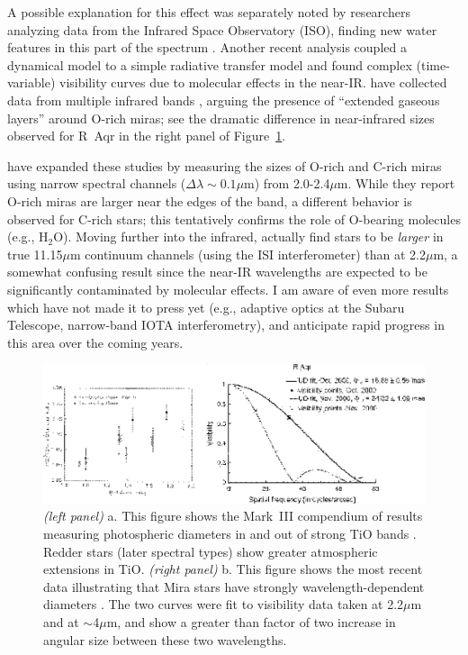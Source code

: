 \documentclass[12pt]{article}
\begin{document}
A possible explanation for this effect was separately noted by
researchers analyzing data from the Infrared Space Observatory (ISO),
finding new water features in this part of the spectrum
\citep[e.g.,][]{tsuji1997,matsuura2002}.  Another recent analysis
\citep{jacob2002} coupled a dynamical model to a simple radiative
transfer model and found complex (time-variable) visibility curves due
to molecular effects in the near-IR.  \citet{mennesson2002} have
collected data from multiple infrared bands
\citep[e.g.,][]{chagnon2002}, arguing the presence of ``extended
gaseous layers'' around O-rich miras; see the dramatic difference in
near-infrared sizes observed for R~Aqr in the right panel of
Figure~\ref{atmospheres}.

\citet{thompson2002a} have expanded these studies by measuring the
sizes of O-rich and C-rich miras using narrow spectral channels
($\Delta\lambda\sim 0.1\mu$m) from 2.0-2.4$\mu$m.  While they report
O-rich miras are larger near the edges of the band, a different
behavior is observed for C-rich stars; this tentatively confirms the
role of O-bearing molecules (e.g., H$_2$O).  Moving further into the
infrared, \citet{weiner2000} \citep[following earlier work
by][]{bester1996} actually find stars to be {\em larger} in true
11.15$\mu$m continuum channels (using the ISI interferometer) than at
2.2$\mu$m, a somewhat confusing result since the near-IR wavelengths
are expected to be significantly contaminated by molecular effects.  I
am aware of even more results which have not made it to press yet
(e.g., adaptive optics at the Subaru Telescope, narrow-band IOTA
interferometry), and anticipate rapid progress in this area over the
coming years.

\begin{figure}[tbhp]
\begin{center}
\includegraphics[clip,angle=0,width=5.0in]{Figures/JDM_molecdiameters.eps}
\caption{\footnotesize {\em (left panel)} a. 
  This figure shows the Mark~III compendium of results measuring
  photospheric diameters in and out of strong TiO bands
  \citep[reproduced from Figure~2 of][with permission of the
  AAS]{quirrenbach1993a}. Redder stars (later spectral types) show
  greater atmospheric extensions in TiO.
{\em (right panel)} b. This figure shows the most recent
data illustrating that Mira stars have strongly wavelength-dependent
diameters
\citep[reproduced from Figure~2 of][with permission of the AAS]{mennesson2002}.
The two curves were fit to visibility data taken at 2.2$\mu$m and at
$\sim$4$\mu$m, and show a greater than factor of two increase in
angular size between these two wavelengths.
\label{atmospheres}}
\end{center}
\end{figure}
\end{document}
